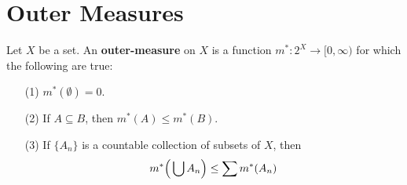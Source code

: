 \section{Outer Measures}

\begin{definition}
    Let $X$ be a set. An \textbf{outer-measure} on $X$ is a function $m^\ast:2^X
    \xrightarrow{} [0, \infty)$ for which the following are true:
    \begin{enumerate}
        \item[(1)] $m^\ast(\emptyset)=0$.

        \item[(2)] If $A \subseteq B$, then $m^\ast(A) \leq m^\ast(B)$.

        \item[(3)] If $\{A_n\}$ is a countable collection of subsets of $X$,
            then
            \begin{equation*}
                m^\ast\Big{(} \bigcup{A_n} \Big{)} \leq \sum{m^\ast(A_n)}
            \end{equation*}
    \end{enumerate}
\end{definition}

